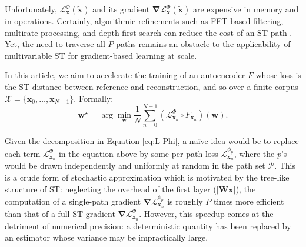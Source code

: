 \documentclass{article} %
\theoremstyle{plain}
\theoremstyle{definition}
\theoremstyle{remark}
\begin{document}
Unfortunately, $\mathcal{L}^{\Phi}_{\boldsymbol{x}}(\boldsymbol{\tilde{x}})$ and its gradient $\boldsymbol{\nabla}\mathcal{L}^{\Phi}_{\boldsymbol{x}}(\boldsymbol{\tilde{x}})$ are expensive in memory and in operations.
Certainly, algorithmic refinements such as FFT-based filtering, multirate processing, and depth-first search can reduce the cost of an ST path \citep{oyallon2018scattering}.
Yet, the need to traverse all $P$ paths remains an obstacle to the applicability of multivariable ST for gradient-based learning at scale.

In this article, we aim to accelerate the training of an autoencoder $F$ whose loss is the ST distance between reference and reconstruction, and so over a finite corpus $\mathcal{X}=\{\boldsymbol{x}_0,\ldots,\boldsymbol{x}_{N-1}\}$. Formally:
\begin{equation}
\boldsymbol{w}^{\star} = \arg\min_{\boldsymbol{w}} \dfrac{1}{N} \sum_{n=0}^{N-1} \left(\mathcal{L}_{\boldsymbol{x}_n}^{\Phi}\circ F_{\boldsymbol{x}_n}\right)(\boldsymbol{w}).
\end{equation}
\vspace{-9pt}

Given the decomposition in Equation \ref{eq:L-Phi}, a naïve idea would be to replace each term $\mathcal{L}_{\boldsymbol{x}_n}^{\Phi}$ in the equation above by some per-path loss $\mathcal{L}_{\boldsymbol{x}_n}^{\phi_{p}}$, where the $p$'s would be drawn independently and uniformly at random in the path set $\mathcal{P}$.
This is a crude form of stochastic approximation \citep{benveniste2012adaptive} which is motivated by the tree-like structure of ST: neglecting the overhead of the first layer ($\vert\mathbf{W}\boldsymbol{x}\vert$), the computation of a single-path gradient $\boldsymbol{\nabla}\mathcal{L}_{\boldsymbol{x}_n}^{\phi_{p}}$ is roughly $P$ times more efficient than that of a full ST gradient $\boldsymbol{\nabla}\mathcal{L}_{\boldsymbol{x}_n}^{\Phi}$.
However, this speedup comes at the detriment of numerical precision: a deterministic quantity has been replaced by an estimator whose variance may be impractically large.
\end{document}
